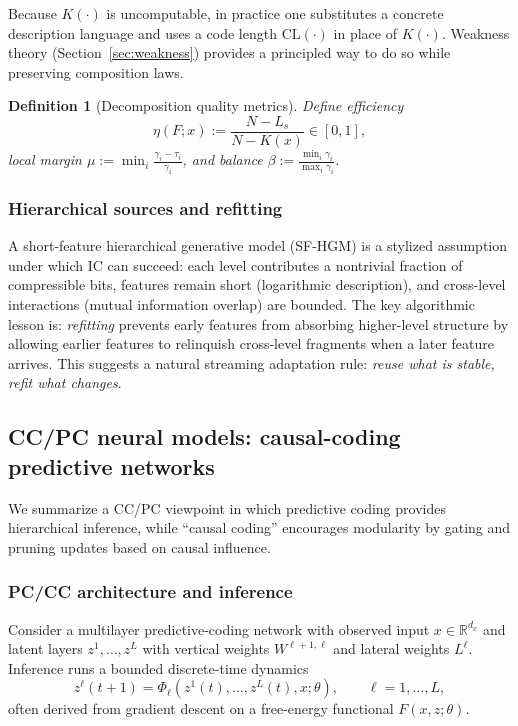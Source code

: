 \documentclass[11pt]{article}
\newcommand{\R}{\mathbb{R}}
\newcommand{\code}{\mathrm{CL}}  %
\newtheorem{definition}{Definition}
\begin{document}
Because $K(\cdot)$ is uncomputable, in practice one substitutes a concrete description language and
uses a code length $\code(\cdot)$ in place of $K(\cdot)$. Weakness theory (Section~\ref{sec:weakness})
provides a principled way to do so while preserving composition laws.

\begin{definition}[Decomposition quality metrics]
Define efficiency
\[
\eta(F;x) := \frac{N - L_s}{N - K(x)} \in [0,1],
\]
local margin $\mu := \min_i \frac{\gamma_i-\tau_i}{\gamma_i}$, and balance
$\beta := \frac{\min_i \gamma_i}{\max_i \gamma_i}$.
\end{definition}

\subsubsection{Hierarchical sources and refitting}
A short-feature hierarchical generative model (SF-HGM) is a stylized assumption under which IC can succeed:
each level contributes a nontrivial fraction of compressible bits, features remain short (logarithmic description),
and cross-level interactions (mutual information overlap) are bounded. The key algorithmic lesson is:
\emph{refitting} prevents early features from absorbing higher-level structure by allowing earlier features
to relinquish cross-level fragments when a later feature arrives. This suggests a natural streaming adaptation rule:
\emph{reuse what is stable, refit what changes}.

\subsection{CC/PC neural models: causal-coding predictive networks}\label{sec:ccpc}
We summarize a CC/PC viewpoint in which predictive coding provides hierarchical inference, while
``causal coding'' encourages modularity by gating and pruning updates based on causal influence.

\subsubsection{PC/CC architecture and inference}
Consider a multilayer predictive-coding network with observed input $x \in \R^{d_x}$ and latent layers
$z^1,\dots,z^L$ with vertical weights $W^{\ell+1,\ell}$ and lateral weights $L^{\ell}$. Inference runs a bounded
discrete-time dynamics
\[
z^\ell(t+1) = \Phi_\ell(z^1(t),\dots,z^L(t),x;\theta), \qquad \ell=1,\dots,L,
\]
often derived from gradient descent on a free-energy functional $F(x,z;\theta)$.
\end{document}
